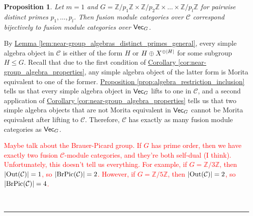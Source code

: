 \documentclass[12pt, reqno]{amsart}
\makeatletter
\def\section{\@startsection{section}{1}\z@{0pt}{0.5\linespacing}{\LARGE\scshape}}
\numberwithin{equation}{section}
\theoremstyle{plainspace}
\newtheorem{proposition}[theorem]{Proposition}
\theoremstyle{definitionspace}
\theoremstyle{remarkspace}
\renewenvironment{proof}{{\noindent\textbf{Proof.}}}{\null\hfill\qedsymbol}
\newcommand{\sectionbar}[4]{
	\noindent\\[#3\linespacing] \rule{#1\linewidth}{#2} \\[#4\linespacing]
}
\DeclarePairedDelimiter{\abs}{\lvert}{\rvert}
\newcommand{\mathcat}[1]{\mathcal{#1}}
\newcommand{\textcat}[1]{\textup{\textsf{#1}}}
\newcommand{\BrPic}[1][]{
	\ifthenelse{\equal{#1}{}}
		{\textup{BrPic}}
		{\textup{BrPic}\!\left(#1\right)}
}
\newcommand{\Out}{\textup{Out}}
\makeatother
\begin{document}
\begin{proposition}\label{prop:near-group_algebras_distinct_primes_special}
Let $m = 1$ and $G = \mathbb{Z}/p_1\mathbb{Z} \times \mathbb{Z}/p_2\mathbb{Z} \times \dots \times \mathbb{Z}/p_l\mathbb{Z}$ for pairwise distinct primes $p_1, \dots, p_l$. Then fusion module categories over $\mathcat{C}$ correspond bijectively to fusion module categories over $\textcat{Vec}_G$.
\end{proposition}
\leavevmode\newline
\begin{proof}
\noindent By \hyperref[lem:near-group_algebras_distinct_primes_general]{Lemma \ref*{lem:near-group_algebras_distinct_primes_general}}, every simple algebra object in $\mathcat{C}$ is either of the form $H$ or $H \oplus X^{\oplus \abs{H}}$ for some subgroup $H \leq G$. Recall that due to the first condition of \hyperref[cor:near-group_algebra_properties]{Corollary \ref*{cor:near-group_algebra_properties}}, any simple algebra object of the latter form is Morita equivalent to one of the former. \hyperref[prop:algebra_restriction_inclusion]{Proposition \ref*{prop:algebra_restriction_inclusion}} tells us that every simple algebra object in $\textcat{Vec}_G$ lifts to one in $\mathcat{C}$, and a second application of \hyperref[cor:near-group_algebra_properties]{Corollary \ref*{cor:near-group_algebra_properties}} tells us that two simple algebra objects that are not Morita equivalent in $\textcat{Vec}_G$ cannot be Morita equivalent after lifting to $\mathcat{C}$. Therefore, $\mathcat{C}$ has exactly as many fusion module categories as $\textcat{Vec}_G$.
\end{proof}
\newline

\noindent \textcolor{red}{Maybe talk about the Brauer-Picard group. If $G$ has prime order, then we have exactly two fusion $\mathcat{C}$-module categories, and they're both self-dual (I think). Unfortunately, this doesn't tell us everything. For example, if $G = \mathbb{Z}/3\mathbb{Z}$, then $\abs{\Out(\mathcat{C})} = 1$, so $\abs{\BrPic(\mathcat{C})} = 2$. However, if $G = \mathbb{Z}/5\mathbb{Z}$, then $\abs{\Out(\mathcat{C})} = 2$, so $\abs{\BrPic(\mathcat{C})} = 4$.}
\newpage


\section{References}
\sectionbar{1}{1pt}{-2}{0}

\printbibliography[heading = none]
\end{document}

